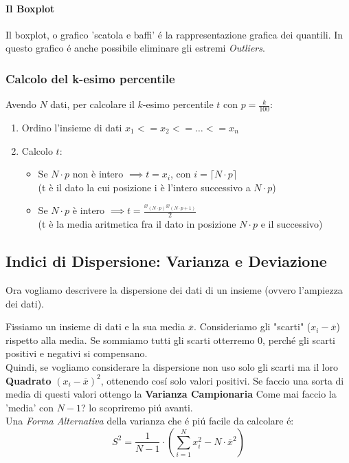 \paragraph{Il Boxplot}
Il boxplot,  o grafico 'scatola e baffi' é la rappresentazione grafica dei quantili.
In questo grafico é anche possibile eliminare gli estremi \emph{Outliers}.


\subsubsection{Calcolo del k-esimo percentile}
Avendo $N$ dati, per calcolare il $k$-esimo percentile $t$ con $p=\frac{k}{100}$:
\begin{enumerate}
    \item Ordino l'insieme di dati $x_1 <= x_2 <= \dots <= x_n$
    \item Calcolo $t$:
        \begin{itemize}
            \item Se $N \cdot p$ non è intero $\implies t=x_i$, con $i= \lceil N \cdot p \rceil $
             \\\small{(t è il dato la cui posizione i è l'intero successivo a $N \cdot p$)}
            \item Se $N \cdot p$ è intero $\implies t = \frac{x_{(N\cdot p)} x_{(N \cdot p+1)}}{2}$
            \\\small{(t è la media aritmetica fra il dato in posizione $N \cdot p$ e il successivo)}
        \end{itemize}
\end{enumerate}

\subsection[Varianza e Deviazione]{Indici di Dispersione: Varianza e Deviazione}
Ora vogliamo descrivere la dispersione dei dati di un insieme (ovvero l'ampiezza dei dati).

Fissiamo un insieme di dati e la sua media $\overline{x}$.
Consideriamo gli "scarti" ($x_i-\overline{x}$) rispetto alla media. Se sommiamo tutti gli scarti otterremo 0, perché gli scarti positivi e negativi si compensano.
\\Quindi, se vogliamo considerare la dispersione non uso solo gli scarti ma il loro \textbf{Quadrato} $(x_i-\overline{x})^2$, ottenendo cosí solo valori positivi.
Se faccio una sorta di media di questi valori ottengo la \textbf{Varianza Campionaria}
Come mai faccio la 'media' con $N-1$? lo scopriremo piú avanti.
\\Una \emph{Forma Alternativa} della varianza che é piú facile da calcolare é: 
\[
    S^2 = \frac{1}{N-1} \cdot ( \sum_{i=1}^{N} x_i^2- N \cdot \overline{x}^2)  
\]
